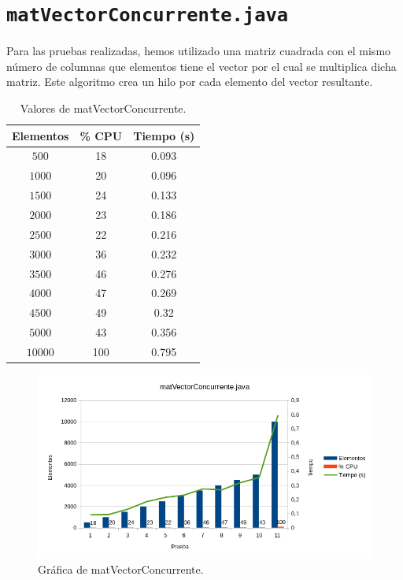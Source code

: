 \documentclass[12pt,letterpaper]{article}
\begin{document}
\newpage
\section{\texttt{matVectorConcurrente.java}}

Para las pruebas realizadas, hemos utilizado una matriz cuadrada con el mismo número de columnas que elementos tiene el vector por el cual se multiplica dicha matriz. Este algoritmo crea un hilo por cada elemento del vector resultante.
\begin{center}
	\begin{table}[htbp]
		\begin{center}
			\begin{tabular}{|c|c|c|}
				\hline
				\textbf{Elementos} & \textbf{\% CPU} & \textbf{Tiempo (s)}  \\
				\hline 
				$500$ & 18 & 0.093\\ \hline	
				$1000$ & 20 & 0.096\\ \hline
				$1500$ & 24 & 0.133\\ \hline
				$2000$ & 23 & 0.186\\ \hline
				$2500$ & 22 & 0.216\\ \hline
				$3000$ & 36 & 0.232\\ \hline
				$3500$ & 46 & 0.276\\ \hline
				$4000$ & 47 & 0.269\\ \hline
				$4500$ & 49 & 0.32\\ \hline
				$5000$ & 43 & 0.356\\ \hline				
				$10000$ & 100 & 0.795\\ \hline	
			\end{tabular}
			\caption{Valores de matVectorConcurrente.}
			\label{tabla:Valores de matVectorConcurrente}
		\end{center}
	\end{table}
\end{center}
\begin{figure}[h]
	\begin{center}
		\includegraphics[scale=0.8]{matVectorConcurrente.png}
		\caption{Gráfica de matVectorConcurrente.}
		\label{fig: matVectorConcurrente}
	\end{center}	
\end{figure}
\end{document}
